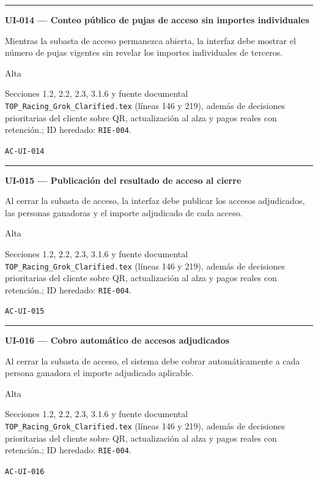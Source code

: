\documentclass[10pt,letterpaper]{article}
\begin{document}
\vspace{0.25em}\hrule\vspace{0.65em}
\noindent\textbf{UI-014 --- Conteo público de pujas de acceso sin importes individuales}\par
\begin{description}[style=nextline,leftmargin=3.15cm,labelwidth=2.8cm,font=\normalfont\bfseries]
\item[Obligación] Mientras la subasta de acceso permanezca abierta, la interfaz debe mostrar el número de pujas vigentes sin revelar los importes individuales de terceros.
\item[Prioridad] Alta
\item[Procedencia] Secciones 1.2, 2.2, 2.3, 3.1.6 y fuente documental \texttt{TOP\_Racing\_Grok\_Clarified.tex} (líneas 146 y 219), además de decisiones prioritarias del cliente sobre QR, actualización al alza y pagos reales con retención.; ID heredado: \texttt{RIE-004}.
\item[Verificación] \texttt{AC-UI-014}
\end{description}
\vspace{0.25em}\hrule\vspace{0.65em}
\noindent\textbf{UI-015 --- Publicación del resultado de acceso al cierre}\par
\begin{description}[style=nextline,leftmargin=3.15cm,labelwidth=2.8cm,font=\normalfont\bfseries]
\item[Obligación] Al cerrar la subasta de acceso, la interfaz debe publicar los accesos adjudicados, las personas ganadoras y el importe adjudicado de cada acceso.
\item[Prioridad] Alta
\item[Procedencia] Secciones 1.2, 2.2, 2.3, 3.1.6 y fuente documental \texttt{TOP\_Racing\_Grok\_Clarified.tex} (líneas 146 y 219), además de decisiones prioritarias del cliente sobre QR, actualización al alza y pagos reales con retención.; ID heredado: \texttt{RIE-004}.
\item[Verificación] \texttt{AC-UI-015}
\end{description}
\vspace{0.25em}\hrule\vspace{0.65em}
\noindent\textbf{UI-016 --- Cobro automático de accesos adjudicados}\par
\begin{description}[style=nextline,leftmargin=3.15cm,labelwidth=2.8cm,font=\normalfont\bfseries]
\item[Obligación] Al cerrar la subasta de acceso, el sistema debe cobrar automáticamente a cada persona ganadora el importe adjudicado aplicable.
\item[Prioridad] Alta
\item[Procedencia] Secciones 1.2, 2.2, 2.3, 3.1.6 y fuente documental \texttt{TOP\_Racing\_Grok\_Clarified.tex} (líneas 146 y 219), además de decisiones prioritarias del cliente sobre QR, actualización al alza y pagos reales con retención.; ID heredado: \texttt{RIE-004}.
\item[Verificación] \texttt{AC-UI-016}
\end{description}
\end{document}
